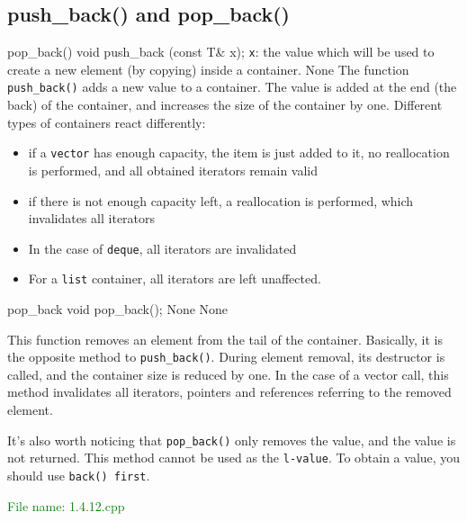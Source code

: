 
\subsection{push\_back() and pop\_back()} %
\begin{methodinfo}
  {pop_back()}
  {void push_back (const T& x);}
  {\texttt{x}: the value which will be used to create a new element (by copying) inside a container.}
  {None}
  {The function \texttt{push\_back()} adds a new value to a container. The value is added at the end 
  (the back) of the container, and increases the size of the container by one. Different types of containers 
  react differently:}
  \begin{itemize}
    \item if a \texttt{vector} has enough capacity, the item is just added to it, no reallocation is performed, 
      and all obtained iterators remain valid
    \item if there is not enough capacity left, a reallocation is performed, which invalidates all iterators
    \item In the case of \texttt{deque}, all iterators are invalidated
    \item For a \texttt{list} container, all iterators are left unaffected.
  \end{itemize}
\end{methodinfo}

\begin{methodinfo}
  {pop_back}
  {void pop_back();}
  {None}
  {None}
  {This function removes an element from the tail of the container. Basically, it is the opposite 
  method to \texttt{push\_back()}. During element removal, its destructor is called, and the container 
  size is reduced by one. In the case of a vector call, this method invalidates all iterators, 
  pointers and references referring to the removed element.

  It’s also worth noticing that \texttt{pop\_back()} only removes the value, and the value is 
  not returned. This method cannot be used as the \texttt{l-value}. To obtain a value, you should 
  use \texttt{back() first}.}
\end{methodinfo}

\textcolor{green}{File name: 1.4.12.cpp}


